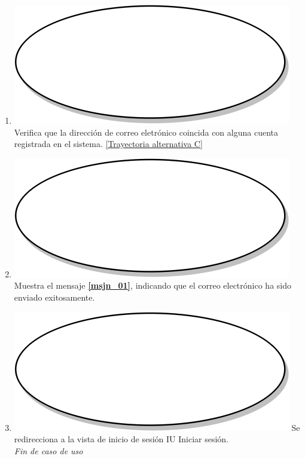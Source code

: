 \begin{enumerate}
  \item {\includegraphics[scale=.05]{Capitulo3/img/proceso.png} Verifica que la dirección de correo eletrónico coincida con alguna cuenta registrada en el sistema. \hyperref[cu1_1_ta_c]{[Trayectoria alternativa C]}}
  \item {\includegraphics[scale=.05]{Capitulo3/img/proceso.png} Muestra el mensaje \textbf{\ref{msjn_01}}, indicando que el correo electrónico ha sido enviado exitosamente.}
  \item {\includegraphics[scale=.1]{Capitulo3/img/proceso.png} Se redirecciona a la vista de inicio de sesión IU Iniciar sesión.} \\
  \textit{Fin de caso de uso} \\	
\end{enumerate}

